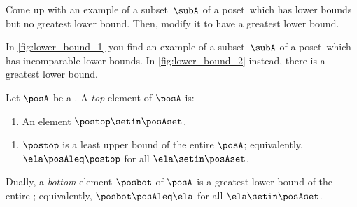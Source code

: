 \begin{exercise}
    Come up with an example of a subset~$\subA$ of a poset~\posA which has lower bounds but no greatest lower bound.
    Then, modify it to have a greatest lower bound.
\end{exercise}

\begin{solution}
    \begin{marginfigure}
        \centering
        \caption{
            Example of lower bounds of~$\subA$.
        }
        \label{fig:lower_bound_1}
    \end{marginfigure}

    \begin{marginfigure}
        \centering
        \caption{
            Example of lower bounds and greatest lower bounds of~$\subA$.
        }
        \label{fig:lower_bound_2}
    \end{marginfigure}

    In \cref{fig:lower_bound_1} you find an example of a subset~$\subA$ of a poset~\posA which has incomparable lower bounds.
    In \cref{fig:lower_bound_2} instead, there is a greatest lower bound.
\end{solution}

\begin{ctdefinition}
    \label{def:top}
    \label{def:bot}
    Let $\posA$ be a . A \emph{top} element of $\posA$ is:

    \constit
    \begin{enumerate}
        \item An element $\postop \setin \posAset$.
    \end{enumerate}

    \condit
    \begin{enumerate}
        \item $\postop$ is a least upper bound of the entire  $\posA$; equivalently, $\ela \posAleq \postop$ for all $\ela \setin \posAset$.
    \end{enumerate}
    Dually, a \emph{bottom} element $\posbot$ of $\posA$ is a greatest lower bound of the entire ; equivalently, $\posbot \posAleq \ela$ for all $\ela \setin \posAset$.
\end{ctdefinition}


